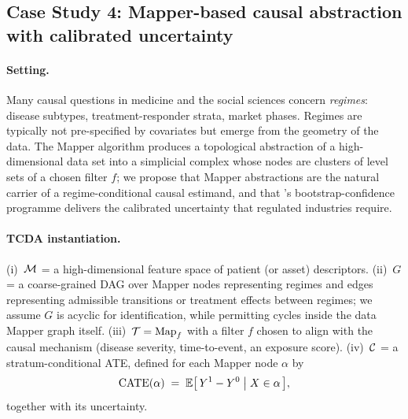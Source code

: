 \subsection{Case Study 4: Mapper-based causal abstraction with
calibrated uncertainty}\label{sec:cs_mapper}

\paragraph{Setting.}
Many causal questions in medicine and the social sciences concern
\emph{regimes}: disease subtypes, treatment-responder strata, market
phases. Regimes are typically not pre-specified by covariates but emerge
from the geometry of the data. The Mapper algorithm
\citep{singh2007mapper,carriere2018statistical,dlotko2019ball,
madukpe2026mapper} produces a topological abstraction of a
high-dimensional data set into a simplicial complex whose nodes are
clusters of level sets of a chosen filter $f$; we propose that Mapper
abstractions are the natural carrier of a regime-conditional causal
estimand, and that \citet{lecci2014statistical}'s bootstrap-confidence
programme delivers the calibrated uncertainty that regulated industries
require.

\paragraph{TCDA instantiation.}
(i)~$\mathcal{M}$ = a high-dimensional feature space of patient (or asset)
descriptors. (ii)~$G$ = a coarse-grained DAG over Mapper nodes
representing regimes and edges representing admissible transitions or
treatment effects between regimes; we assume $G$ is acyclic for
identification, while permitting cycles inside the data Mapper graph
itself. (iii)~$\mathcal{T} = \mathrm{Map}_f$ with a filter $f$ chosen to align with the
causal mechanism (disease severity, time-to-event, an exposure score).
(iv)~$\mathcal{C}$ = a stratum-conditional ATE, defined for each Mapper node
$\alpha$ by
\begin{equation}
  \operatorname{CATE}(\alpha) \;=\; \mathbb{E}\bigl[\,Y^1 - Y^0 \;\big|\; X \in \alpha\,\bigr],
  \label{eq:cate_mapper}
\end{equation}
together with its uncertainty.

